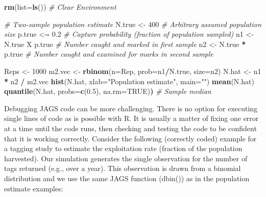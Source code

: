 \documentclass[
]{krantz}
\makeatletter
\newenvironment{Shaded}{\begin{snugshade}}{\end{snugshade}}
\newcommand{\AttributeTok}[1]{\textcolor[rgb]{0.27,0.27,0.27}{#1}}
\newcommand{\CommentTok}[1]{\textcolor[rgb]{0.37,0.37,0.37}{\textit{#1}}}
\newcommand{\ConstantTok}[1]{\textcolor[rgb]{0.37,0.37,0.37}{#1}}
\newcommand{\DecValTok}[1]{\textcolor[rgb]{0.06,0.06,0.06}{#1}}
\newcommand{\ErrorTok}[1]{\textcolor[rgb]{0.14,0.14,0.14}{\textbf{#1}}}
\newcommand{\FloatTok}[1]{\textcolor[rgb]{0.06,0.06,0.06}{#1}}
\newcommand{\FunctionTok}[1]{\textcolor[rgb]{0.27,0.27,0.27}{\textbf{#1}}}
\newcommand{\NormalTok}[1]{#1}
\newcommand{\OtherTok}[1]{\textcolor[rgb]{0.37,0.37,0.37}{#1}}
\newcommand{\SpecialCharTok}[1]{\textcolor[rgb]{0.43,0.43,0.43}{\textbf{#1}}}
\newcommand{\StringTok}[1]{\textcolor[rgb]{0.5,0.5,0.5}{#1}}
\newenvironment{kframe}{%
\medskip{}
\setlength{\fboxsep}{.8em}
 \def\at@end@of@kframe{}%
 \ifinner\ifhmode%
  \def\at@end@of@kframe{\end{minipage}}%
  \begin{minipage}{\columnwidth}%
 \fi\fi%
 \def\FrameCommand##1{\hskip\@totalleftmargin \hskip-\fboxsep
 \colorbox{shadecolor}{##1}\hskip-\fboxsep
     \hskip-\linewidth \hskip-\@totalleftmargin \hskip\columnwidth}%
 \MakeFramed {\advance\hsize-\width
   \@totalleftmargin\z@ \linewidth\hsize
   \@setminipage}}%
 {\par\unskip\endMakeFramed%
 \at@end@of@kframe}
\renewenvironment{Shaded}{\begin{kframe}}{\end{kframe}}
\makeatother
\begin{document}
\begin{Shaded}
\begin{Highlighting}[]
\FunctionTok{rm}\NormalTok{(}\AttributeTok{list=}\FunctionTok{ls}\NormalTok{()) }\CommentTok{\# Clear Environment}

\CommentTok{\# Two{-}sample population estimate}
\NormalTok{N.true }\OtherTok{\textless{}{-}} \DecValTok{400}  \CommentTok{\# Arbitrary assumed population size}
\NormalTok{p.true }\OtherTok{\textless{}{-}}\SpecialCharTok{{-}} \FloatTok{0.2} \CommentTok{\# Capture probability (fraction of population sampled)}
\NormalTok{n1 }\OtherTok{\textless{}{-}}\NormalTok{ N.true X p.true }\CommentTok{\# Number caught and marked in first sample}
\NormalTok{n2 }\OtherTok{\textless{}{-}}\NormalTok{ N.true }\SpecialCharTok{*}\NormalTok{ p.true }\CommentTok{\# Number caught and examined for marks in second sample}

\NormalTok{Reps }\OtherTok{\textless{}{-}} \DecValTok{1000}
\NormalTok{m2.vec }\OtherTok{\textless{}{-}} \FunctionTok{rbinom}\NormalTok{(}\AttributeTok{n=}\NormalTok{Rep, }\AttributeTok{prob=}\NormalTok{n1}\SpecialCharTok{/}\NormalTok{N.true, }\AttributeTok{size=}\NormalTok{n2)}
\NormalTok{N.hat }\OtherTok{\textless{}{-}}\NormalTok{ n1 }\SpecialCharTok{*}\NormalTok{ n2 }\SpecialCharTok{/}\NormalTok{ m2.vec}
\FunctionTok{hist}\NormalTok{(N.hat, }\AttributeTok{xlab=}\StringTok{"Population estimate"}\NormalTok{, }\AttributeTok{main=}\StringTok{""}\NormalTok{)}
\FunctionTok{mean}\NormalTok{(N.hat)}
\FunctionTok{quantile}\NormalTok{(N.hat, }\AttributeTok{probs=}\FunctionTok{c}\NormalTok{(}\FloatTok{0.5}\NormalTok{), }\AttributeTok{na.rm=}\ConstantTok{TRUE}\NormalTok{)}\ErrorTok{)}  \CommentTok{\# Sample median}
\end{Highlighting}
\end{Shaded}

Debugging JAGS code can be more challenging. There is no option for executing single lines of code as is possible with R. It is usually a matter of fixing one error at a time until the code runs, then checking and testing the code to be confident that it is working correctly. Consider the following (correctly coded) example for a tagging study to estimate the exploitation rate (fraction of the population harvested). Our simulation generates the single observation for the number of tags returned (e.g., over a year). This observation is drawn from a binomial distribution and we use the same JAGS function (dbin()) as in the population estimate examples:
\end{document}
